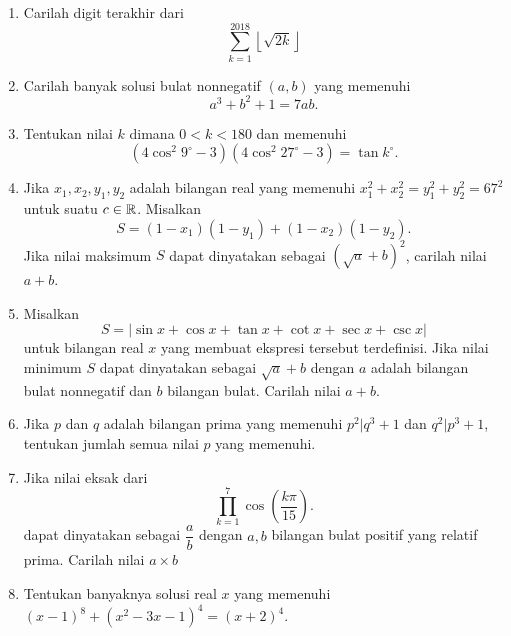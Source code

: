\documentclass[12pt]{scrartcl}
\title{}
\begin{document}
\renewcommand*\contentsname{Daftar Isi}
\tableofcontents

\newpage

\begin{enumerate}
\section{Isian Singkat}
   	\item
	Carilah digit terakhir dari $$\sum_{k=1}^{2018} \left \lfloor \sqrt{2k} \right \rfloor $$

	\item
	Carilah banyak solusi bulat nonnegatif $(a,b)$ yang memenuhi $$a^3+b^2+1=7ab.$$

    \item Tentukan nilai $k$ dimana $0< k < 180$ dan memenuhi
    $$(4 \cos ^2 9^\circ - 3)(4 \cos^2 27^\circ-3)=\tan k^\circ.$$

    \item Jika $x_1,x_2,y_1,y_2$ adalah bilangan real yang memenuhi $x_1^2+x_2^2 = y_1^2+y_2^2 = 67^2$ untuk suatu $c\in \mathbb R$. Misalkan
    $$S=(1-x_1)(1-y_1)+(1-x_2)(1-y_2).$$
    Jika nilai maksimum $S$ dapat dinyatakan sebagai $(\sqrt{a}+b)^2$, carilah nilai $a+b$.

    \item Misalkan
    $$S=|\sin x+\cos x + \tan x + \cot x + \sec x + \csc x|$$
    untuk bilangan real $x$ yang membuat ekspresi tersebut terdefinisi. Jika nilai minimum $S$ dapat dinyatakan sebagai $\sqrt{a}+b$ dengan $a$ adalah bilangan bulat nonnegatif dan $b$ bilangan bulat. Carilah nilai $a + b$.

    \item Jika $p$ dan $q$ adalah bilangan prima yang memenuhi $p^2|q^3+1$ dan $q^2|p^3+1$, tentukan jumlah semua nilai $p$ yang memenuhi.

    \item Jika nilai eksak dari $$\prod_{k=1}^{7}\cos \left ( \frac{k\pi}{15} \right ).$$
    dapat dinyatakan sebagai $\dfrac{a}{b}$ dengan $a,b$ bilangan bulat positif yang relatif prima. Carilah nilai $a \times b$

    \item Tentukan banyaknya solusi real $x$ yang memenuhi $(x-1)^8+(x^2-3x-1)^4=(x+2)^4.$


\end{enumerate}
\end{document}
